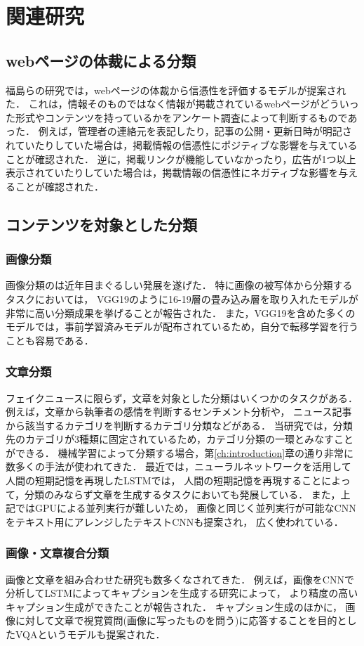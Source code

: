 \chapter{関連研究}
\section{webページの体裁による分類}
福島らの研究\cite{2007}では，webページの体裁から信憑性を評価するモデルが提案された．
これは，情報そのものではなく情報が掲載されているwebページがどういった形式やコンテンツを持っているかをアンケート調査によって判断するものであった．
例えば，管理者の連絡元を表記したり，記事の公開・更新日時が明記されていたりしていた場合は，掲載情報の信憑性にポジティブな影響を与えていることが確認された．
逆に，掲載リンクが機能していなかったり，広告が1つ以上表示されていたりしていた場合は，掲載情報の信憑性にネガティブな影響を与えることが確認された．

\section{コンテンツを対象とした分類}

\subsection{画像分類}
画像分類のは近年目まぐるしい発展を遂げた．
特に画像の被写体から分類するタスクにおいては，
VGG19のように16-19層の畳み込み層を取り入れたモデルが非常に高い分類成果を挙げることが報告\cite{DBLP:journals/corr/SimonyanZ14a}された．
また，VGG19を含めた多くのモデルでは，事前学習済みモデルが配布されているため，自分で転移学習を行うことも容易である．

\subsection{文章分類}
フェイクニュースに限らず，文章を対象とした分類はいくつかのタスクがある．
例えば，文章から執筆者の感情を判断するセンチメント分析や，
ニュース記事から該当するカテゴリを判断するカテゴリ分類などがある．
当研究では，分類先のカテゴリが3種類に固定されているため，カテゴリ分類の一環とみなすことができる．
機械学習によって分類する場合，第\ref{ch:introduction}章の通り非常に数多くの手法が使われてきた．
最近では，ニューラルネットワークを活用して人間の短期記憶を再現したLSTM\cite{7508408}では，
人間の短期記憶を再現することによって，分類のみならず文章を生成するタスクにおいても発展している．
また，上記ではGPUによる並列実行が難しいため，
画像と同じく並列実行が可能なCNNをテキスト用にアレンジしたテキストCNNも提案\cite{DBLP:journals/corr/Kim14f}され，
広く使われている．

\subsection{画像・文章複合分類}
画像と文章を組み合わせた研究も数多くなされてきた．
例えば，画像をCNNで分析してLSTMによってキャプションを生成する研究\cite{7298935}によって，
より精度の高いキャプション生成ができたことが報告された．
キャプション生成のほかに，
画像に対して文章で視覚質問(画像に写ったものを問う)に応答することを目的としたVQA\cite{7410636}というモデルも提案された．
